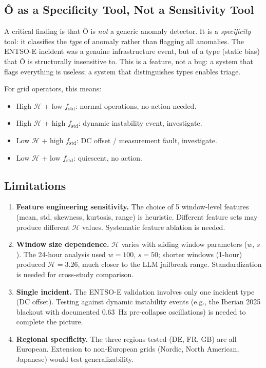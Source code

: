 \documentclass[11pt,a4paper]{article}
\begin{document}
\subsection{Ô as a Specificity Tool, Not a Sensitivity Tool}

A critical finding is that Ô is \emph{not} a generic anomaly detector. It is a \emph{specificity} tool: it classifies the \emph{type} of anomaly rather than flagging all anomalies. The ENTSO-E incident was a genuine infrastructure event, but of a type (static bias) that Ô is structurally insensitive to. This is a feature, not a bug: a system that flags everything is useless; a system that distinguishes types enables triage.

For grid operators, this means:
\begin{itemize}
    \item High $\mathcal{H}$ + low $f_{\text{std}}$: normal operations, no action needed.
    \item High $\mathcal{H}$ + high $f_{\text{std}}$: dynamic instability event, investigate.
    \item Low $\mathcal{H}$ + high $f_{\text{std}}$: DC offset / measurement fault, investigate.
    \item Low $\mathcal{H}$ + low $f_{\text{std}}$: quiescent, no action.
\end{itemize}

\subsection{Limitations}

\begin{enumerate}[label=(\arabic*)]
    \item \textbf{Feature engineering sensitivity.} The choice of 5 window-level features (mean, std, skewness, kurtosis, range) is heuristic. Different feature sets may produce different $\mathcal{H}$ values. Systematic feature ablation is needed.
    \item \textbf{Window size dependence.} $\mathcal{H}$ varies with sliding window parameters ($w$, $s$). The 24-hour analysis used $w=100$, $s=50$; shorter windows (1-hour) produced $\mathcal{H}=3.26$, much closer to the LLM jailbreak range. Standardization is needed for cross-study comparison.
    \item \textbf{Single incident.} The ENTSO-E validation involves only one incident type (DC offset). Testing against dynamic instability events (e.g., the Iberian 2025 blackout with documented 0.63~Hz pre-collapse oscillations) is needed to complete the picture.
    \item \textbf{Regional specificity.} The three regions tested (DE, FR, GB) are all European. Extension to non-European grids (Nordic, North American, Japanese) would test generalizability.
\end{enumerate}
\end{document}
